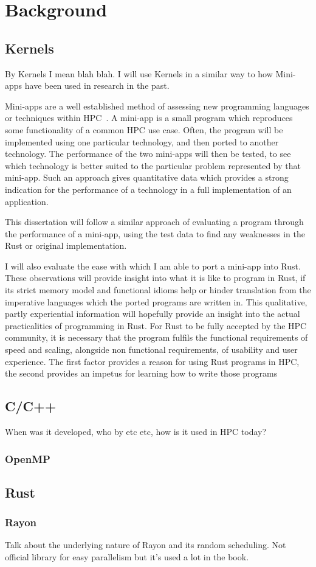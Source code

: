 \chapter{Background}
\section{Kernels}
By Kernels I mean blah blah. I will use Kernels in a similar way to how Mini-apps have been used in research in the past.

Mini-apps are a well established method of assessing new programming languages or techniques within HPC~\cite{Mallinson:2014, Slaughter:2015, martineau2017arch}. A mini-app is a small program which reproduces some functionality of a common HPC use case. Often, the program will be implemented using one particular technology, and then ported to another technology. The performance of the two mini-apps will then be tested, to see which technology is better suited to the particular problem represented by that mini-app. Such an approach gives quantitative data which provides a strong indication for the performance of a technology in a full implementation of an application.

This dissertation will follow a similar approach of evaluating a program through the performance of a mini-app, using the test data to find any weaknesses in the Rust or original implementation.

I will also evaluate the ease with which I am able to port a mini-app into Rust. These observations will provide insight into what it is like to program in Rust, if its strict memory model and functional idioms help or hinder translation from the imperative languages which the ported programs are written in. This qualitative, partly experiential information will hopefully provide an insight into the actual practicalities of programming in Rust. For Rust to be fully accepted by the HPC community, it is necessary that the program fulfils the functional requirements of speed and scaling, alongside non functional requirements, of usability and user experience. The first factor provides a reason for using Rust programs in HPC, the second provides an impetus for learning how to write those programs

\section{C/C++}
When was it developed, who by etc etc, how is it used in HPC today?
\subsection{OpenMP}

\section{Rust}
\subsection{Rayon}
Talk about the underlying nature of Rayon and its random scheduling. Not official library for easy parallelism but it's used a lot in the book.
